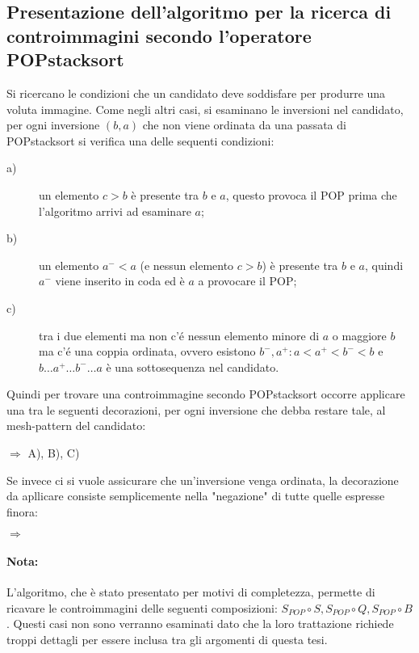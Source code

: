 \subsection{Presentazione  dell'algoritmo per la ricerca di controimmagini secondo l'operatore POPstacksort} 
Si ricercano le condizioni che un candidato deve soddisfare per produrre una voluta immagine. Come negli altri casi, si esaminano le inversioni nel candidato, per ogni inversione $(b,a)$ che non viene ordinata da una passata di POPstacksort si verifica una delle sequenti condizioni:
\begin{description}
	\item[a)] un elemento $c>b$ \`e presente tra $b$ e $a$, questo provoca il POP prima che l'algoritmo arrivi ad esaminare $a$;
	\item[b)] un elemento $a^-<a$ (e nessun elemento $c>b$) \`e presente tra $b$ e $a$, quindi $a^-$ viene inserito in coda ed \`e $a$ a provocare il POP;
	\item[c)] tra i due elementi ma non c'\'e nessun elemento minore di $a$ o maggiore $b$ ma c'\'e una coppia ordinata, ovvero esistono ${b^-,a^+}:a<a^+<b^-<b$ e $b\dots{a^+}\dots{b^-}\dots{a}$ \`e una sottosequenza nel candidato.
\end{description}
Quindi per trovare una controimmagine secondo POPstacksort occorre applicare una tra le seguenti decorazioni, per ogni inversione che debba restare tale, al mesh-pattern del candidato:
\begin{center}
$\Rightarrow$
A),
B),
C)
\end{center}
Se invece ci si vuole assicurare che un'inversione venga ordinata, la decorazione da apllicare consiste semplicemente nella "negazione" di tutte quelle espresse finora:
\begin{center}
$\Rightarrow$
\end{center}
\paragraph*{Nota:} L'algoritmo, che \`e stato presentato per motivi di completezza, permette di ricavare le controimmagini delle seguenti composizioni: $S_{POP}\circ{S},S_{POP}\circ{Q},S_{POP}\circ{B}$. Questi casi non sono verranno esaminati dato che la loro trattazione richiede troppi dettagli per essere inclusa tra gli argomenti di questa tesi.
